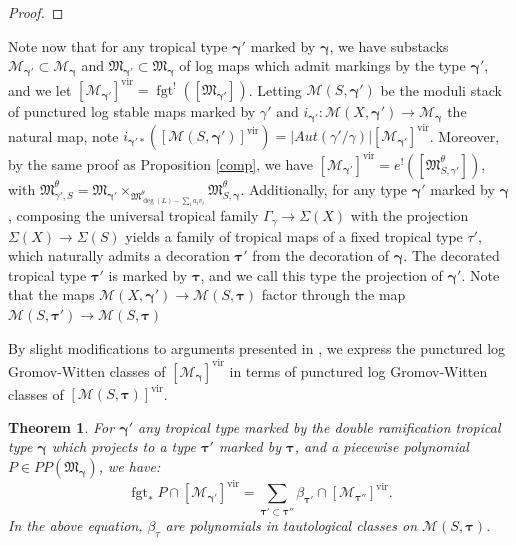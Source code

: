 \documentclass[12pt, oneside]{amsart}   	%
\newcounter{thm}
\newtheorem{theorem}[thm]{Theorem}
\newcommand{\fgt}{\operatorname{fgt}}
\newcommand{\vir}{\operatorname{vir}}
\numberwithin{equation}{section}
\numberwithin{thm}{section}
\numberwithin{figure}{section}
\begin{document}
\begin{proof}
\end{proof}


Note now that for any tropical type $\pmb\gamma'$ marked by $\pmb\gamma$, we have substacks $\mathscr{M}_{\pmb\gamma'}\subset \mathscr{M}_{\pmb\gamma}$ and $\mathfrak{M}_{\pmb\gamma'}\subset \mathfrak{M}_{\pmb\gamma}$ of log maps which admit markings by the type $\pmb\gamma'$, and we let $[\mathscr{M}_{\pmb\gamma'}]^{\vir} = \fgt^!([\mathfrak{M}_{\pmb\gamma'}])$. Letting $\mathscr{M}(S,\pmb\gamma')$ be the moduli stack of punctured log stable maps marked by $\gamma'$ and $i_{\pmb\gamma'}: \mathscr{M}(X,\pmb\gamma') \rightarrow \mathscr{M}_{\pmb\gamma}$ the natural map, note $i_{\pmb\gamma'*}([\mathscr{M}(S,\pmb\gamma')]^{\vir}) = |Aut(\gamma'/\gamma)|[\mathscr{M}_{\pmb\gamma'}]^{\vir}$. Moreover, by the same proof as Proposition \ref{comp}, we have $[\mathscr{M}_{\pmb\gamma'}]^{\vir} =e^!([\mathfrak{M}^{\theta}_{S,\gamma'}])$, with $\mathfrak{M}^{\theta}_{\gamma',S} = \mathfrak{M}_{\pmb\gamma'} \times_{\mathfrak{M}^{\theta}_{\deg(L)-\sum_i a_iv_i}} \mathfrak{M}^{\theta}_{S,\pmb\gamma}$. Additionally, for any type $\pmb\gamma'$ marked by $\pmb\gamma$, composing the universal tropical family $\Gamma_{\gamma} \rightarrow \Sigma(X)$ with the projection $\Sigma(X) \rightarrow \Sigma(S)$ yields a family of tropical maps of a fixed tropical type $\tau'$, which naturally admits a decoration $\pmb\tau'$ from the decoration of $\pmb\gamma$. The decorated tropical type $\pmb\tau'$ is marked by $\pmb\tau$, and we call this type the projection of $\pmb\gamma'$. Note that the maps $\mathscr{M}(X,\pmb\gamma') \rightarrow \mathscr{M}(S,\pmb\tau)$ factor through the map $\mathscr{M}(S,\pmb\tau') \rightarrow \mathscr{M}(S,\pmb\tau)$

By slight modifications to arguments presented in \cite{BNtaut}, we express the punctured log Gromov-Witten classes of $[\mathscr{M}_{\pmb\gamma}]^{\vir}$ in terms of punctured log Gromov-Witten classes of $[\mathscr{M}(S,\pmb\tau)]^{\vir}$. 

\begin{theorem}\label{DRtaut}
For $\pmb\gamma'$ any tropical type marked by the double ramification tropical type $\pmb\gamma$ which projects to a type $\pmb\tau'$ marked by $\pmb\tau$, and a piecewise polynomial $P \in PP(\mathfrak{M}_{\pmb\gamma})$, we have:
\[\fgt_*P\cap[\mathscr{M}_{\pmb\gamma'}]^{\vir} = \sum_{\pmb\tau' \subset \pmb\tau''} \beta_{\pmb\tau'}\cap [\mathscr{M}_{\pmb\tau''}]^{\vir}.\]
In the above equation, $\beta_{\tau}$ are polynomials in tautological classes on $\mathscr{M}(S,\pmb\tau)$. 
\end{theorem}
\end{document}
